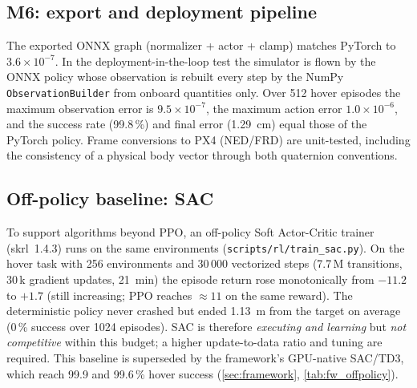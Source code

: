 \documentclass[11pt,a4paper]{article}
\begin{document}
\subsection{M6: export and deployment pipeline}
The exported ONNX graph (normalizer + actor + clamp) matches PyTorch to $3.6\times10^{-7}$. In the
deployment-in-the-loop test the simulator is flown by the ONNX policy whose observation is rebuilt every step by the
NumPy \texttt{ObservationBuilder} from onboard quantities only. Over 512 hover episodes the maximum observation error is
$9.5\times10^{-7}$, the maximum action error $1.0\times10^{-6}$, and the success rate (99.8\,\%) and final error
(\SI{1.29}{cm}) equal those of the PyTorch policy. Frame conversions to PX4 (NED/FRD) are unit-tested, including the
consistency of a physical body vector through both quaternion conventions.

\subsection{Off-policy baseline: SAC}
To support algorithms beyond PPO, an off-policy Soft Actor-Critic trainer (skrl~1.4.3) runs on the same
environments (\texttt{scripts/rl/train\_sac.py}). On the hover task with 256 environments and 30\,000 vectorized steps
(7.7\,M transitions, 30\,k gradient updates, \SI{21}{min}) the episode return rose monotonically from $-11.2$ to $+1.7$
(still increasing; PPO reaches $\approx 11$ on the same reward). The deterministic policy never crashed but ended
\SI{1.13}{m} from the target on average (0\,\% success over 1024 episodes). SAC is therefore \emph{executing and
learning} but \emph{not competitive} within this budget; a higher update-to-data ratio and tuning are required.
This baseline is superseded by the framework's GPU-native SAC/TD3, which reach 99.9 and 99.6\,\% hover success
(\cref{sec:framework}, \cref{tab:fw_offpolicy}).
\end{document}

